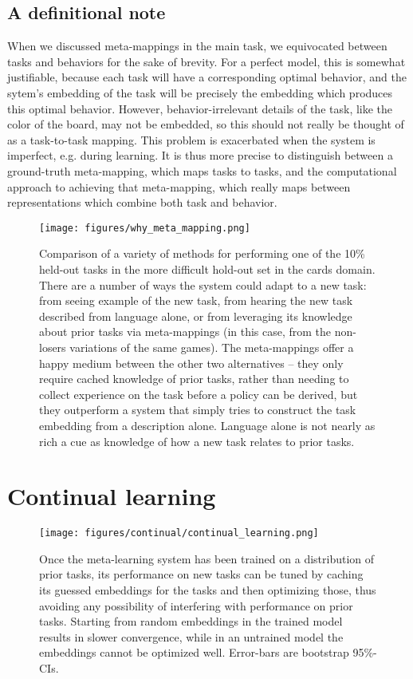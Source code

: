 \subsection{A definitional note}
When we discussed meta-mappings in the main task, we equivocated between tasks and behaviors for the sake of brevity. For a perfect model, this is somewhat justifiable, because each task will have a corresponding optimal behavior, and the sytem's embedding of the task will be precisely the embedding which produces this optimal behavior. However, behavior-irrelevant details of the task, like the color of the board, may not be embedded, so this should not really be thought of as a task-to-task mapping. This problem is exacerbated when the system is imperfect, e.g. during learning. It is thus more precise to distinguish between a ground-truth meta-mapping, which maps tasks to tasks, and the computational approach to achieving that meta-mapping, which really maps between representations which combine both task and behavior. \par
\begin{figure}[H]
\centering
\texttt{[image: figures/why\_meta\_mapping.png]}
\caption{Comparison of a variety of methods for performing one of the 10\% held-out tasks in the more difficult hold-out set in the cards domain. There are a number of ways the system could adapt to a new task: from seeing example of the new task, from hearing the new task described from language alone, or from leveraging its knowledge about prior tasks via meta-mappings (in this case, from the non-losers variations of the same games). The meta-mappings offer a happy medium between the other two alternatives -- they only require cached knowledge of prior tasks, rather than needing to collect experience on the task before a policy can be derived, but they outperform a system that simply tries to construct the task embedding from a description alone. Language alone is not nearly as rich a cue as knowledge of how a new task relates to prior tasks.} 
\label{fig_why_meta_mapping}
\end{figure}
\section{Continual learning} \label{app_continual}
\begin{figure}[H]
\centering
\texttt{[image: figures/continual/continual\_learning.png]}
\caption{Once the meta-learning system has been trained on a distribution of prior tasks, its performance on new tasks can be tuned by caching its guessed embeddings for the tasks and then optimizing those, thus avoiding any possibility of interfering with performance on prior tasks. Starting from random embeddings in the trained model results in slower convergence, while in an untrained model the embeddings cannot be optimized well. Error-bars are bootstrap 95\%-CIs.}
\label{poly_continual_results}
\end{figure}
\vspace{-0.7em}
